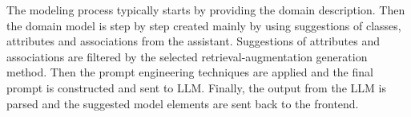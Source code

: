 The modeling process typically starts by providing the domain description. Then the domain model is step by step created mainly by using suggestions of classes, attributes and associations from the assistant. Suggestions of attributes and associations are filtered by the selected retrieval-augmentation generation method. Then the prompt engineering techniques are applied and the final prompt is constructed and sent to LLM. Finally, the output from the LLM is parsed and the suggested model elements are sent back to the frontend.